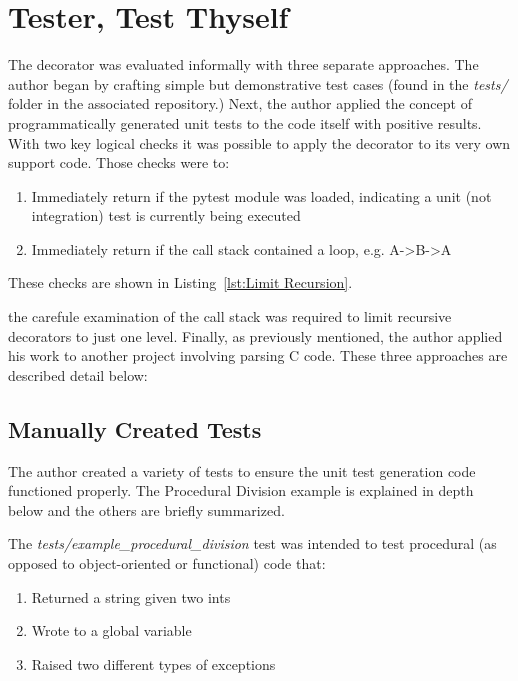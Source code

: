 \section{Tester, Test Thyself}\label{sec:evaluation}

The decorator was evaluated informally with three separate approaches.
The author began by crafting simple but demonstrative test cases 
(found in the \textit{tests/} folder in the associated repository.) Next,
the author applied the concept of programmatically generated unit tests
to the code itself with positive results. With two key logical checks it
was possible to apply the decorator to its very own support code.  Those
checks were to:

\begin{enumerate}
  \item Immediately return if the pytest module was loaded, indicating a unit (not integration) test is currently being executed
  \item Immediately return if the call stack contained a loop, e.g. A->B->A
\end{enumerate}

These checks are shown in Listing~\ref{lst:Limit Recursion}.



the carefule examination of the call stack was required to limit 
recursive decorators to just one level. Finally, as previously mentioned, 
the author applied his work to another project involving parsing C code. 
These three approaches are described detail below:

\subsection{Manually Created Tests}\label{sec:eval-1}
The author created a variety of tests to ensure the unit test generation 
code functioned properly. The Procedural Division example is explained in depth
below and the others are briefly summarized.

The \textit{tests/example\_procedural\_division} test was intended 
to test procedural (as opposed to object-oriented or functional) code that:  

\begin{enumerate}
    \item Returned a string given two ints
    \item Wrote to a global variable
    \item Raised two different types of exceptions
\end{enumerate}

